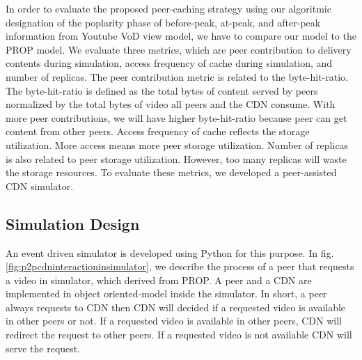 \documentclass[10pt,final,journal,a4paper]{IEEEtran}
\begin{document}
In order to evaluate the proposed peer-caching strategy using our algoritmic designation of the poplarity phase of before-peak, at-peak, and after-peak information from Youtube VoD view model, we have to compare our model to the PROP model.
We evaluate three metrics, which are peer contribution to delivery contents during simulation,  access frequency of cache during simulation, and number of replicas. 
The peer contribution metric is related to the byte-hit-ratio. 
The byte-hit-ratio is defined as the total bytes of content served by peers normalized by the total bytes of video all peers and the CDN consume.
With more peer contributions, we will have higher byte-hit-ratio because peer can get content from other peers. 
Access frequency of cache reflects the storage utilization. 
More access means more peer storage utilization.  
Number of replicas is also related to peer storage utilization.  
However, too many replicas will waste the storage resources.
To evaluate these metrics, we developed a peer-assisted CDN simulator. 


\subsection{Simulation Design}\label{simulationdesign}
An event driven simulator is developed using Python for this purpose.
In fig.\ref{fig:p2pcdninteractioninsimulator}, we describe the process of a peer that requests a video in simulator, which derived from PROP.
A peer and a CDN are implemented in object oriented-model inside the simulator. 
In short, a peer always requests to CDN then CDN will decided if a requested video is available in other peers or not. 
If a requested video is available in other peers, CDN will redirect the request to other peers.
If a requested video is not available CDN will serve the request.
\end{document}
